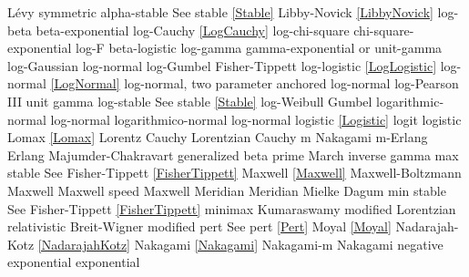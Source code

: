 L\'evy symmetric alpha-stable	\dotfill   	See stable \eqref{Stable}			\ncite
Libby-Novick					\dotfill	\eqref{LibbyNovick}					\ncite	
log-beta						\dotfill	beta-exponential					 	%
log-Cauchy						\dotfill	\eqref{LogCauchy}					\ncite
log-chi-square					\dotfill	chi-square-exponential				\ncite	%
log-F							\dotfill	beta-logistic						\ncite	%
log-gamma 						\dotfill	gamma-exponential or unit-gamma		\ncite	%
log-Gaussian					\dotfill	log-normal							\ncite	%
log-Gumbel						\dotfill	Fisher-Tippett						\ncite	%
log-logistic					\dotfill	\eqref{LogLogistic}  				\ncite	%
log-normal						\dotfill	\eqref{LogNormal}					\ncite	%
log-normal, two parameter		\dotfill	anchored log-normal					\ncite	%
log-Pearson III					\dotfill	unit gamma							\ncite
log-stable						\dotfill	See stable \eqref{Stable}			\ncite
log-Weibull 					\dotfill	Gumbel 								\ncite	%
logarithmic-normal				\dotfill	log-normal 							\ncite	%
logarithmico-normal				\dotfill	log-normal 							\ncite	%
logistic 						\dotfill	\eqref{Logistic} 					\ncite	%
logit							\dotfill	logistic 							\ncite	%
Lomax 							\dotfill	\eqref{Lomax}						\ncite	%
Lorentz  						\dotfill	Cauchy 								\ncite	%
Lorentzian  					\dotfill	Cauchy 								\ncite	%
%
m 								\dotfill	Nakagami 							 	%
m-Erlang						\dotfill	Erlang 								\ncite	%
Majumder-Chakravart				\dotfill	generalized beta prime				 %
March 							\dotfill	inverse gamma						\ncite	%
max stable						\dotfill	See Fisher-Tippett \eqref{FisherTippett}	\ncite
Maxwell 						\dotfill	\eqref{Maxwell} 					\ncite	%
Maxwell-Boltzmann 				\dotfill	Maxwell 							\ncite 	%
Maxwell speed					\dotfill	Maxwell 							\ncite	%
Meridian						\dotfill	Meridian							\ncite
Mielke							\dotfill	Dagum								\ncite	%
min stable						\dotfill	See Fisher-Tippett \eqref{FisherTippett}	\ncite
minimax 						\dotfill	Kumaraswamy 						 	%
modified Lorentzian				\dotfill	relativistic Breit-Wigner				%
modified pert					\dotfill	See pert \eqref{Pert}				\ncite	%
Moyal							\dotfill	\eqref{Moyal}						\ncite	
%
Nadarajah-Kotz					\dotfill	\eqref{NadarajahKotz}				\mcite{\self}	%
Nakagami 						\dotfill	\eqref{Nakagami} 					\ncite	%
Nakagami-m 						\dotfill	Nakagami 							\ncite   	%
negative exponential			\dotfill	exponential 						\ncite	%
